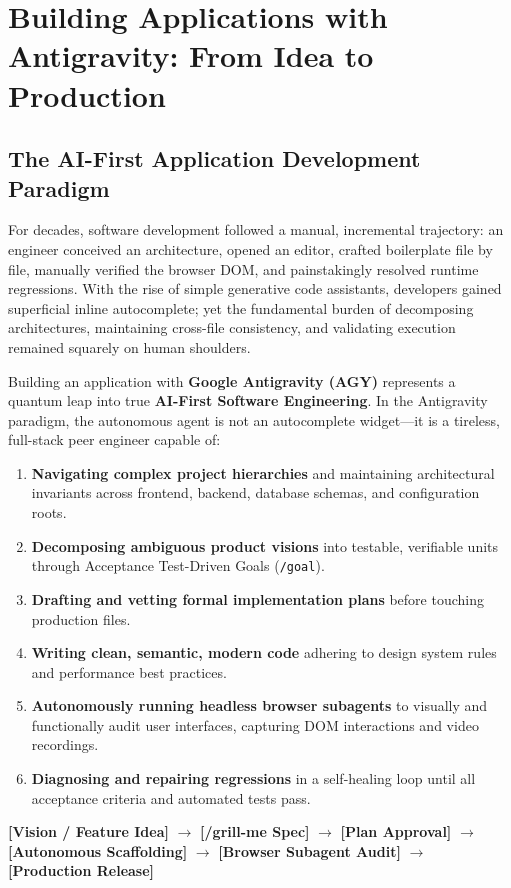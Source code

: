 \documentclass[11pt,a4paper,oneside]{book}
\begin{document}
\chapter{Building Applications with Antigravity: From Idea to Production}

\section{The AI-First Application Development Paradigm}
For decades, software development followed a manual, incremental trajectory: an engineer conceived an architecture, opened an editor, crafted boilerplate file by file, manually verified the browser DOM, and painstakingly resolved runtime regressions. With the rise of simple generative code assistants, developers gained superficial inline autocomplete; yet the fundamental burden of decomposing architectures, maintaining cross-file consistency, and validating execution remained squarely on human shoulders.

Building an application with \textbf{Google Antigravity (AGY)} represents a quantum leap into true \textbf{AI-First Software Engineering}. In the Antigravity paradigm, the autonomous agent is not an autocomplete widget---it is a tireless, full-stack peer engineer capable of:
\begin{enumerate}
    \item \textbf{Navigating complex project hierarchies} and maintaining architectural invariants across frontend, backend, database schemas, and configuration roots.
    \item \textbf{Decomposing ambiguous product visions} into testable, verifiable units through Acceptance Test-Driven Goals (\texttt{/goal}).
    \item \textbf{Drafting and vetting formal implementation plans} before touching production files.
    \item \textbf{Writing clean, semantic, modern code} adhering to design system rules and performance best practices.
    \item \textbf{Autonomously running headless browser subagents} to visually and functionally audit user interfaces, capturing DOM interactions and video recordings.
    \item \textbf{Diagnosing and repairing regressions} in a self-healing loop until all acceptance criteria and automated tests pass.
\end{enumerate}

\begin{center}
\textbf{[Vision / Feature Idea]} $\longrightarrow$ \textbf{[/grill-me Spec]} $\longrightarrow$ \textbf{[Plan Approval]} $\longrightarrow$ \textbf{[Autonomous Scaffolding]} $\longrightarrow$ \textbf{[Browser Subagent Audit]} $\longrightarrow$ \textbf{[Production Release]}
\end{center}
\end{document}
